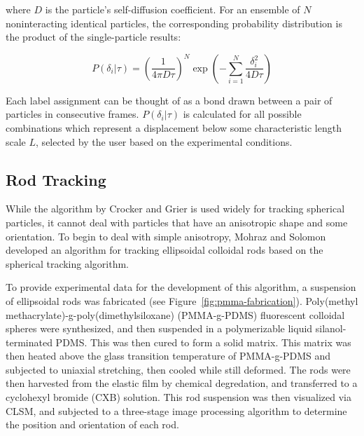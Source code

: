 where $D$ is the particle's self-diffusion coefficient.  For an ensemble of $N$ noninteracting
identical particles, the corresponding probability distribution is the product of the 
single-particle results:

\begin{center}\begin{equation}P({\delta_i}|\tau) = \left( \frac{1}{4\pi D\tau} \right)^N 
\exp{ \left( -\sum_{i=1}^N \frac{\delta_i^2}{4D\tau} \right) }
\end{equation}\end{center}

Each label assignment can be thought of as a bond drawn between a pair of particles
in consecutive frames.  $P({\delta_i}|\tau)$ is calculated for all possible combinations which
represent a displacement below some characteristic length scale $L$, selected by the user based on
the experimental conditions.

\subsection{Rod Tracking}

While the algorithm by Crocker and Grier is used widely for tracking spherical particles, it 
cannot deal with particles that have an anisotropic shape and some orientation. 
To begin to deal with simple anisotropy, Mohraz and Solomon developed an algorithm for tracking 
ellipsoidal colloidal rods based on the spherical tracking algorithm.~\cite{rods-mohraz, solomon-dynamics}


To provide experimental data for the development of this algorithm, a suspension of 
ellipsoidal rods was fabricated (see Figure~\ref{fig:pmma-fabrication}).
Poly(methyl methacrylate)-g-poly(dimethylsiloxane) (PMMA-g-PDMS) fluorescent colloidal spheres were
synthesized, and then suspended in a polymerizable liquid silanol-terminated PDMS.
This was then cured to form a solid 
matrix.  This matrix was then heated above the glass transition temperature 
of PMMA-g-PDMS and subjected to 
uniaxial stretching, then cooled while still deformed.  The rods were then harvested from the 
elastic film by chemical degredation, and transferred to a cyclohexyl bromide (CXB) solution.
This rod suspension was then visualized via CLSM, and 
subjected to a three-stage image processing algorithm to determine the position and orientation of each rod.

